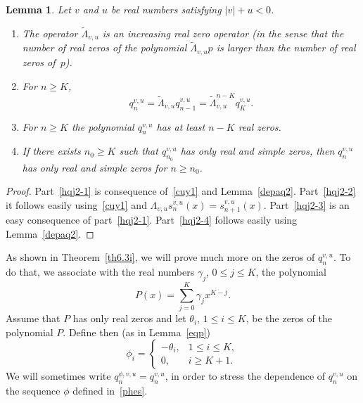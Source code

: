 \documentclass[10pt, a4paper, leqno]{amsart}
\numberwithin{equation}{section}
\theoremstyle{plain}
\newtheorem{Lem}[Theo]{Lemma}
\theoremstyle{remark}
\newcommand{\scvu}{s^{v,u}}
\begin{document}
\begin{Lem}
\label{hqj2}
Let $v$ and $u$ be real numbers satisfying $|v|+u<0$.
\begin{enumerate}
\item\label{hqj2-1}
The operator $\tilde\Lambda_{v,u}$ is an increasing real zero operator (in the sense that the number of real zeros of the polynomial $\tilde \Lambda_{v,u}p$ is larger than the number of real zeros of~$p$).
\item\label{hqj2-2}
For $n\ge K$,
\begin{equation}
\label{cuy}
  q_n^{v,u} = \tilde \Lambda_{v,u}q_{n-1}^{v,u} = \tilde \Lambda_{v,u}^{n-K}q_K^{v,u}.
\end{equation}
\item\label{hqj2-3}
For $n\ge K$ the polynomial $q_n^{v,u}$ has at least $n-K$ real zeros.
\item\label{hqj2-4}
If there exists $n_0\ge K$ such that $q_{n_0}^{v,u}$ has only real and simple zeros, then $q_n^{v,u}$ has only real and simple zeros for $n\ge n_0$.
\end{enumerate}
\end{Lem}

\begin{proof}
Part~\eqref{hqj2-1} is consequence of~\eqref{cuy1} and Lemma~\ref{depaq2}.
Part~\eqref{hqj2-2} it follows easily using~\eqref{cuy1} and $\Lambda_{v,u}\scvu_n(x) = \scvu_{n+1}(x)$.
Part~\eqref{hqj2-3} is an easy consequence of part~\eqref{hqj2-1}. Part~\eqref{hqj2-4} follows easily using Lemma~\ref{depaq2}.
\end{proof}

As shown in Theorem~\ref{th6.3i}, we will prove much more on the zeros of $q_n^{v,u}$. To do that, we associate with the real numbers $\gamma_j$, $0\le j\le K$, the polynomial
\begin{equation}
\label{polp}
  P(x) = \sum_{j=0}^K\gamma_jx^{K-j}.
\end{equation}
Assume that $P$ has only real zeros and let $\theta_i$, $ 1\le i\le K$, be the zeros of the polynomial $P$. Define then (as in Lemma~\ref{eqp})
\begin{equation}
\label{phes}
  \phi_i = \begin{cases} -\theta_i,&1\le i\le K,\\ 0,&i\ge K+1.\end{cases}
\end{equation}
We will sometimes write $q_n^{\phi,v,u}=q_n^{v,u}$, in order to stress the dependence of $q_n^{v,u}$ on the sequence $\phi$ defined in~\eqref{phes}.
\end{document}
